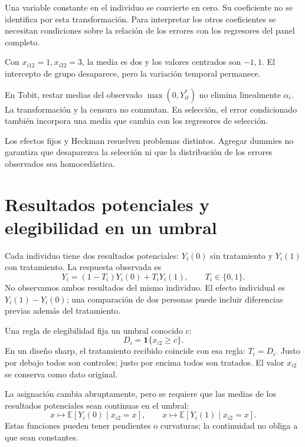 \documentclass[11pt,a4paper]{article}
\newcommand{\E}{\mathbb E}
\begin{document}
Una variable constante en el individuo
se convierte en cero.
Su coeficiente no se identifica por
esta transformación. Para interpretar los
otros coeficientes se necesitan condiciones
sobre la relación de los errores con
los regresores del panel completo.

\begin{ejemplo}
Con \(x_{i12}=1,x_{i22}=3\),
la media es dos y los valores centrados
son \(-1,1\).
El intercepto de grupo desaparece,
pero la variación temporal permanece.
\end{ejemplo}
En Tobit, restar medias del observado
\(\max(0,Y_{it}^\ast)\) no elimina
linealmente \(\alpha_i\).
La transformación y la censura no conmutan.
En selección, el error condicionado
también incorpora una media que cambia
con los regresores de selección.

Los efectos fijos y Heckman resuelven
problemas distintos. Agregar dummies
no garantiza que desaparezca la selección
ni que la distribución de los errores
observados sea homocedástica.

\clearpage
{}
\section{Resultados potenciales y elegibilidad en un umbral}\label{unidad19}
Cada individuo tiene dos resultados potenciales:
\(Y_i(0)\) sin tratamiento y \(Y_i(1)\) con tratamiento.
La respuesta observada es
\[
Y_i=(1-T_i)Y_i(0)+T_iY_i(1),\qquad T_i\in\{0,1\}.
\]
No observamos ambos resultados del mismo individuo.
El efecto individual es \(Y_i(1)-Y_i(0)\);
una comparación de dos personas puede incluir
diferencias previas además del tratamiento.

Una regla de elegibilidad fija un umbral conocido \(c\):
\[
D_i=\mathbf1\{x_{i2}\ge c\}.
\]
En un diseño sharp, el tratamiento recibido coincide
con esa regla: \(T_i=D_i\).
Justo por debajo todos son controles;
justo por encima todos son tratados.
El valor \(x_{i2}\) se conserva como dato original.

La asignación cambia abruptamente, pero se requiere
que las medias de los resultados potenciales
sean continuas en el umbral:
\[
x\longmapsto\E[Y_i(0)\mid x_{i2}=x],
\qquad
x\longmapsto\E[Y_i(1)\mid x_{i2}=x].
\]
Estas funciones pueden tener pendientes o curvaturas;
la continuidad no obliga a que sean constantes.
\end{document}
